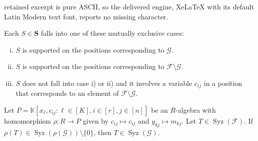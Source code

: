 \documentclass[10pt,a4paper]{amsart}
\DeclareMathOperator{\Syz}{Syz}
\newcommand{\KK}{\mathbb{K}}
\begin{document}
retained excerpt is pure ASCII, so the delivered engine, XeLaTeX with its default Latin Modern text font, reports no missing character.
\begin{lemma}\label{lemma:supp}
Each $S\in \mathbf{S}$ falls into one of these mutually exclusive cases:
\begin{enumerate}[i)]
\item $S$ is supported on the positions corresponding to $\mathcal{G}$.
\item $S$ is supported on the positions corresponding to $\mathcal{F}\setminus \mathcal{G}$.
\item $S$ does not fall into case i) or ii) and it involves a variable $c_{ij}$ in a position that corresponds to an element of $\mathcal{F}\setminus \mathcal{G}$.
\end{enumerate}  
\end{lemma}

\begin{theorem}\label{thm:supp}
Let $P=\KK[x_\ell,c_{ij}: \ell\in[K], i\in[r], j\in[n]]$ be an $R$-algebra with homomorphism $\rho:R\rightarrow P$ given by $c_{ij}\mapsto c_{ij}$ and $y_{kj}\mapsto m_{kj}$.
Let $T\in \Syz(\mathcal{F})$. If $\rho(T)\in \Syz(\rho(\mathcal{G}))\setminus\{0\}$, then $T\in\Syz(\mathcal{G})$.
\end{theorem}
\end{document}
